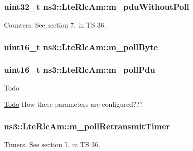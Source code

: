 \subsubsection[{\texorpdfstring{m\+\_\+pdu\+Without\+Poll}{m_pduWithoutPoll}}]{\setlength{\rightskip}{0pt plus 5cm}uint32\+\_\+t ns3\+::\+Lte\+Rlc\+Am\+::m\+\_\+pdu\+Without\+Poll\hspace{0.3cm}{\ttfamily [private]}}\hypertarget{classns3_1_1LteRlcAm_ac7d9ac8a68b2b0ee696d217031df6b6b}{}\label{classns3_1_1LteRlcAm_ac7d9ac8a68b2b0ee696d217031df6b6b}
Counters. See section 7. in TS 36. 
\subsubsection[{\texorpdfstring{m\+\_\+poll\+Byte}{m_pollByte}}]{\setlength{\rightskip}{0pt plus 5cm}uint16\+\_\+t ns3\+::\+Lte\+Rlc\+Am\+::m\+\_\+poll\+Byte\hspace{0.3cm}{\ttfamily [private]}}\hypertarget{classns3_1_1LteRlcAm_a490de522e41312a17e834bb7397d3dc3}{}\label{classns3_1_1LteRlcAm_a490de522e41312a17e834bb7397d3dc3}
\subsubsection[{\texorpdfstring{m\+\_\+poll\+Pdu}{m_pollPdu}}]{\setlength{\rightskip}{0pt plus 5cm}uint16\+\_\+t ns3\+::\+Lte\+Rlc\+Am\+::m\+\_\+poll\+Pdu\hspace{0.3cm}{\ttfamily [private]}}\hypertarget{classns3_1_1LteRlcAm_adddd95c71f8402f62da0eef2b13aa49c}{}\label{classns3_1_1LteRlcAm_adddd95c71f8402f62da0eef2b13aa49c}
\begin{DoxyRefDesc}{Todo}
\item[\hyperlink{todo__todo000095}{Todo}]How these parameters are configured??? \end{DoxyRefDesc}
\subsubsection[{\texorpdfstring{m\+\_\+poll\+Retransmit\+Timer}{m_pollRetransmitTimer}}]{ ns3\+::\+Lte\+Rlc\+Am\+::m\+\_\+poll\+Retransmit\+Timer\hspace{0.3cm}{\ttfamily [private]}}\hypertarget{classns3_1_1LteRlcAm_a9b34f6f4c6993ae026b95be1f63aacfa}{}\label{classns3_1_1LteRlcAm_a9b34f6f4c6993ae026b95be1f63aacfa}
Timers. See section 7. in TS 36. 
